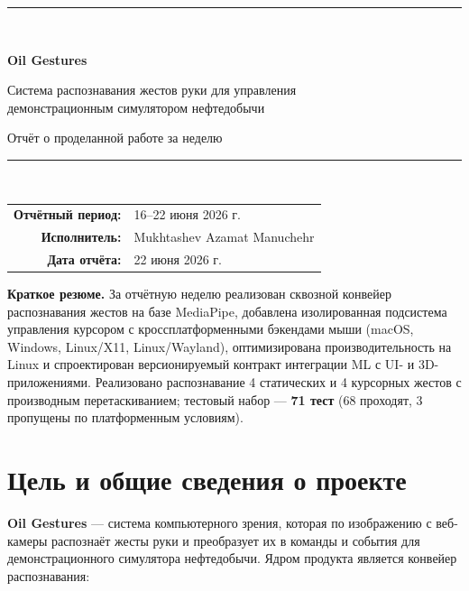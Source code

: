 \documentclass[11pt,a4paper]{article}
\newcommand{\highlight}[1]{\colorbox{accentlight}{\parbox{\dimexpr\linewidth-2\fboxsep}{#1}}}
\begin{document}
\begin{titlepage}
\centering
\vspace*{1.5cm}
{\color{accent}\rule{\linewidth}{1.5pt}}\\[0.5cm]
{\Huge\bfseries Oil Gestures\par}
\vspace{0.4cm}
{\Large Система распознавания жестов руки для управления\\ демонстрационным симулятором нефтедобычи\par}
\vspace{0.3cm}
{\large\color{softgray} Отчёт о проделанной работе за неделю\par}
{\color{accent}\rule{\linewidth}{1.5pt}}\\[1.2cm]

\begin{tabular}{rl}
\textbf{Отчётный период:} & 16--22 июня 2026 г. \\[4pt]
\textbf{Исполнитель:} & Mukhtashev Azamat Manuchehr \\[4pt]
\textbf{Дата отчёта:} & 22 июня 2026 г. \\
\end{tabular}

\vspace{1.4cm}

\highlight{\textbf{Краткое резюме.} За отчётную неделю реализован сквозной конвейер распознавания
жестов на базе MediaPipe, добавлена изолированная подсистема управления курсором с
кроссплатформенными бэкендами мыши (macOS, Windows, Linux/X11, Linux/Wayland), оптимизирована
производительность на Linux и спроектирован версионируемый контракт интеграции ML с UI- и
3D-приложениями. Реализовано распознавание 4 статических и 4 курсорных жестов с производным
перетаскиванием; тестовый набор — \textbf{71 тест} (68 проходят, 3 пропущены по платформенным
условиям).}

\vfill
\end{titlepage}

\tableofcontents
\thispagestyle{fancy}
\newpage

\section{Цель и общие сведения о проекте}

\textbf{Oil Gestures} — система компьютерного зрения, которая по изображению с веб-камеры
распознаёт жесты руки и преобразует их в команды и события для демонстрационного симулятора
нефтедобычи. Ядром продукта является конвейер распознавания:
\end{document}

